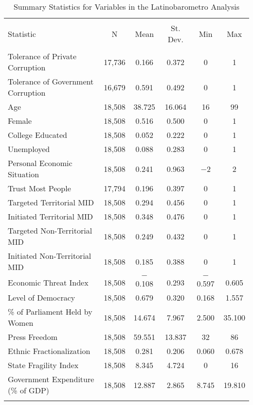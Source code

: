 \documentclass[11pt,]{article}
\begin{document}
\begin{table}[!htbp] \centering 
  \caption{Summary Statistics for Variables in the Latinobarometro Analysis} 
  \label{tab:summarylb} 
\begin{tabular}{@{\extracolsep{5pt}}lccccc} 
\\[-1.8ex]\hline 
\hline \\[-1.8ex] 
Statistic & \multicolumn{1}{c}{N} & \multicolumn{1}{c}{Mean} & \multicolumn{1}{c}{St. Dev.} & \multicolumn{1}{c}{Min} & \multicolumn{1}{c}{Max} \\ 
\hline \\[-1.8ex] 
Tolerance of Private Corruption & 17,736 & 0.166 & 0.372 & 0 & 1 \\ 
Tolerance of Government Corruption & 16,679 & 0.591 & 0.492 & 0 & 1 \\ 
Age & 18,508 & 38.725 & 16.064 & 16 & 99 \\ 
Female & 18,508 & 0.516 & 0.500 & 0 & 1 \\ 
College Educated & 18,508 & 0.052 & 0.222 & 0 & 1 \\ 
Unemployed & 18,508 & 0.088 & 0.283 & 0 & 1 \\ 
Personal Economic Situation & 18,508 & 0.241 & 0.963 & $-$2 & 2 \\ 
Trust Most People & 17,794 & 0.196 & 0.397 & 0 & 1 \\ 
Targeted Territorial MID & 18,508 & 0.294 & 0.456 & 0 & 1 \\ 
Initiated Territorial MID & 18,508 & 0.348 & 0.476 & 0 & 1 \\ 
Targeted Non-Territorial MID & 18,508 & 0.249 & 0.432 & 0 & 1 \\ 
Initiated Non-Territorial MID & 18,508 & 0.185 & 0.388 & 0 & 1 \\ 
Economic Threat Index & 18,508 & $-$0.108 & 0.293 & $-$0.597 & 0.605 \\ 
Level of Democracy & 18,508 & 0.679 & 0.320 & 0.168 & 1.557 \\ 
\% of Parliament Held by Women & 18,508 & 14.674 & 7.967 & 2.500 & 35.100 \\ 
Press Freedom & 18,508 & 59.551 & 13.837 & 32 & 86 \\ 
Ethnic Fractionalization & 18,508 & 0.281 & 0.206 & 0.060 & 0.678 \\ 
State Fragility Index & 18,508 & 8.345 & 4.724 & 0 & 16 \\ 
Government Expenditure (\% of GDP) & 18,508 & 12.887 & 2.865 & 8.745 & 19.810 \\ 
\hline \\[-1.8ex] 
\end{tabular} 
\end{table}
\end{document}
